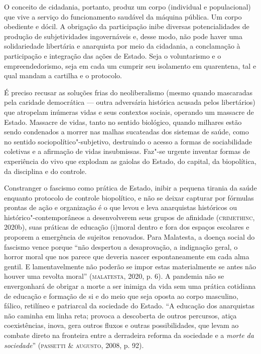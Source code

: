 O conceito de cidadania, portanto, produz um corpo (individual e
populacional) que vive a serviço do funcionamento saudável da máquina
pública. Um corpo obediente e dócil. A obrigação da participação inibe
diversas potencialidades de produção de subjetividades ingovernáveis e,
desse modo, não pode haver uma solidariedade libertária e anarquista por
meio da cidadania, a conclamação à participação e integração das ações
de Estado. Seja o voluntarismo e o empreendedorismo, seja em cada um
cumprir seu isolamento em quarentena, tal e qual mandam a cartilha e o
protocolo.

É preciso recusar as soluções frias do neoliberalismo (mesmo quando
mascaradas pela caridade democrática --- outra adversária histórica
acusada pelos libertários) que atropelam inúmeras vidas e seus contextos
sociais, operando um massacre de Estado. Massacre de vidas, tanto no
sentido biológico, quando milhares estão sendo condenados a morrer nas
malhas sucateadas dos sistemas de saúde, como no sentido
sociopolítico"-subjetivo, destruindo o acesso a formas de sociabilidade
coletivas e a afirmação de vidas insubmissas. Faz"-se urgente inventar
formas de experiência do vivo que explodam as gaiolas do Estado, do
capital, da biopolítica, da disciplina e do controle.

Constranger o fascismo como prática de Estado, inibir a pequena tirania
da saúde enquanto protocolo de controle biopolítico, e não se deixar
capturar por fórmulas prontas de ação e organização é o que levou e leva
anarquistas históricos ou histórico"-contemporâneos a desenvolverem seus
grupos de afinidade (\textsc{crimethinc}, 2020b), suas práticas de educação
(i)moral dentro e fora dos espaços escolares e proporem a emergência de
sujeitos renovados. Para Malatesta, a doença social do fascismo vence
porque ``não despertou a desaprovação, a indignação geral, o horror
moral que nos parece que deveria nascer espontaneamente em cada alma
gentil. E lamentavelmente não poderão se impor estas materialmente se
antes não houver uma revolta moral'' (\textsc{malatesta}, 2020, p. 6). A pandemia
não se envergonhará de obrigar a morte a ser inimiga da vida sem uma
prática cotidiana de educação e formação de si e do meio que seja oposta
ao corpo masculino, fálico, retilíneo e patriarcal da sociedade do
Estado. ``A educação dos anarquistas não caminha em linha reta; provoca
a descoberta de outros percursos, atiça coexistências, inova, gera
outros fluxos e outras possibilidades, que levam ao combate direto na
fronteira entre a derradeira reforma da sociedade e a \emph{morte da
sociedade}'' (\textsc{passetti} \& \textsc{augusto}, 2008, p. 92).

